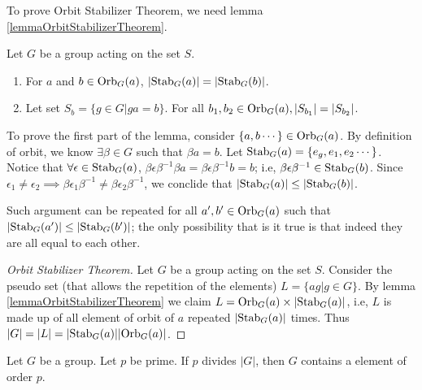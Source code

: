 \documentclass[../note.tex]{subfiles}
\begin{document}
To prove Orbit Stabilizer Theorem, we need lemma \ref{lemmaOrbitStabilizerTheorem}.

\begin{lemma}\label{lemmaOrbitStabilizerTheorem}
	Let $G$ be a group acting on the set $S$.
\begin{enumerate}
	\item For $a$ and $b\in \text{Orb}_{G}({a})$, $|\text{Stab}_{G}({a})|=|\text{Stab}_{G}({b})|$.
	\item Let set $S_b=\{g\in G| ga=b \}$. For all $b_1, b_2 \in \text{Orb}_{G}({a}), |S_{b_1}|=|S_{b_2}|$.
\end{enumerate}
\end{lemma}

To prove the first part of the lemma, consider $\{a,b \cdots\}\in \text{Orb}_{G}({a})$. By definition of orbit, we know $\exists \beta \in G $ such that $\beta a = b$.
Let $\text{Stab}_{G}({a}) = \{e_g, e_1, e_2 \cdots\}$. Notice that $\forall \epsilon \in \text{Stab}_{G}({a})$, $\beta \epsilon \beta^{-1} \beta a = \beta \epsilon \beta^{-1} b = b$; i.e, $\beta \epsilon \beta^{-1} \in \text{Stab}_{G}({b})$. 
Since $\epsilon_1 \neq \epsilon_2 \implies \beta \epsilon_1 \beta^{-1} \neq \beta \epsilon_2 \beta ^{-1}$, we conclide that $|\text{Stab}_{G}({a})| \leq |\text{Stab}_{G}({b})| $.

Such argument can be repeated for all $a',b' \in \text{Orb}_{G}({a})$ such that $|\text{Stab}_{G}({a'})| \leq |\text{Stab}_{G}({b'})|$; the only possibility that is it true is that indeed they are all equal to each other.

\begin{proof}[Orbit Stabilizer Theorem]
	Let $G$ be a group acting on the set $S$. 
	Consider the pseudo set (that allows the repetition of the elements) $L=\{ag| g\in G\}$. 
	By lemma \ref{lemmaOrbitStabilizerTheorem} we claim $L=\text{Orb}_{G}({a}) \times |\text{Stab}_{G}({a})|$, i.e, $L$ is made up of all element of orbit of $a$ repeated $|\text{Stab}_{G}({a})|$ times. Thus $|G|=|L|=|\text{Stab}_{G}({a})||\text{Orb}_{G}({a})|$.
\end{proof}

\begin{theorem}
	Let $G$ be a group. Let $p$ be prime. If $p$ divides $|G|$, then $G$ contains a element of order $p$.
\end{theorem}
\end{document}
